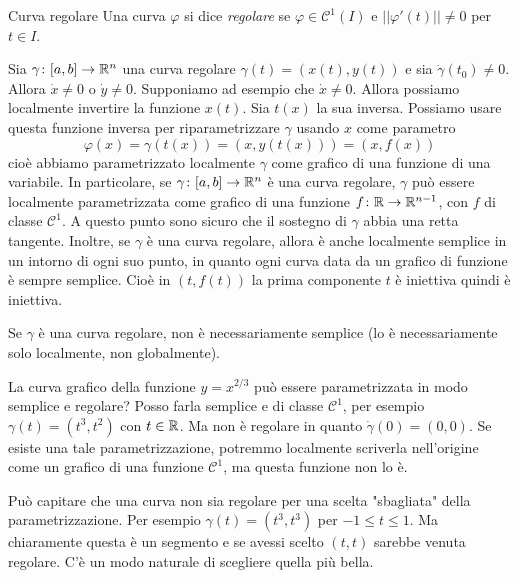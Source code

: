 \documentclass[a4paper]{article}
\begin{document}
\begin{radioactive}
\begin{snippetdefinition}{Curva regolare}
    Una curva \(\varphi\) si dice \emph{regolare} se \(\varphi \in \mathcal{C}^1(I)\)
    e \(||\varphi'(t)|| \neq 0\) per \(t\in I\).
\end{snippetdefinition}
\end{radioactive}

Sia \(\gamma \colon [a,b] \to \mathbb{R}^n\) una curva regolare
\(\gamma(t) = (x(t), y(t))\) e sia \(\dot\gamma(t_0) \neq 0\).
Allora \(\dot{x} \neq 0\)
o \(\dot{y} \neq 0\).
Supponiamo ad esempio che \(\dot{x} \neq 0\).
Allora possiamo localmente invertire la funzione \(x(t)\).
Sia \(t(x)\) la sua inversa. Possiamo usare questa funzione inversa per
riparametrizzare \(\gamma\) usando \(x\) come parametro
\[
    \varphi(x) = \gamma(t(x)) = (x, y(t(x))) = (x, f(x))
\]
cioè abbiamo parametrizzato localmente \(\gamma\) come grafico di una funzione di una variabile.
In particolare, se \(\gamma \colon [a,b] \to \mathbb{R}^n\)
è una curva regolare, \(\gamma\) può essere localmente
parametrizzata come grafico di una funzione \(f \colon \mathbb{R} \to \mathbb{R}^{n-1}\),
con \(f\) di classe \(\mathcal{C}^1\).
A questo punto sono sicuro che il sostegno di \(\gamma\)
abbia una retta tangente.
Inoltre, se \(\gamma\) è una curva regolare, allora è anche localmente semplice in un intorno
di ogni suo punto, in quanto ogni curva data da un grafico di funzione è sempre semplice.
Cioè in \((t,f(t))\) la prima componente \(t\) è iniettiva quindi è iniettiva.

Se \(\gamma\) è una curva regolare, non è necessariamente semplice (lo è necessariamente solo localmente, non globalmente).

\begin{snippetexercise}{}
    La curva grafico della funzione \(y = x^{2/3}\)
    può essere parametrizzata in modo semplice e regolare?
    Posso farla semplice e di classe \(\mathcal{C}^1\),
    per esempio \(\gamma(t) = (t^3, t^2)\) con \(t\in \mathbb{R}\).
    Ma non è regolare in quanto \(\dot\gamma(0) = (0, 0)\).
    Se esiste una tale parametrizzazione, potremmo localmente scriverla nell'origine
    come un grafico di una funzione \(\mathcal{C}^1\), ma questa funzione non lo è.
\end{snippetexercise}

Può capitare che una curva non sia regolare per una scelta "sbagliata" della parametrizzazione.
Per esempio \(\gamma(t) = (t^3, t^3)\) per \(-1 \leq t \leq 1\).
Ma chiaramente questa è un segmento e se avessi scelto \((t,t)\) sarebbe venuta regolare.
C'è un modo naturale di scegliere quella più bella.
\end{document}
